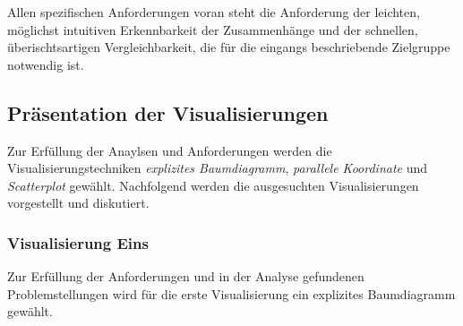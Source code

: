 \documentclass[usegeometry=true]{scrartcl}
\begin{document}
Allen spezifischen Anforderungen voran steht die Anforderung der leichten, möglichst intuitiven Erkennbarkeit der Zusammenhänge und der schnellen, überischtsartigen Vergleichbarkeit,
die für die eingangs beschriebende Zielgruppe notwendig ist.

\subsection{Präsentation der Visualisierungen}
Zur Erfüllung der Anaylsen und Anforderungen werden die Visualisierungstechniken \textit{explizites Baumdiagramm}, \textit{parallele Koordinate} und \textit{Scatterplot} gewählt.
Nachfolgend werden die ausgesuchten Visualisierungen vorgestellt und diskutiert. 

\subsubsection{Visualisierung Eins}
Zur Erfüllung der Anforderungen und in der Analyse gefundenen Problemstellungen wird für die erste Visualisierung ein explizites Baumdiagramm gewählt.
\end{document}
